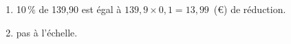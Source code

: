 
\medskip


\medskip

\begin{enumerate}
\item %
10\,\% de 139,90 est égal à $139,9 \times 0,1 = 13,99$~(\euro) de réduction.
\item %
pas à l'échelle.




\end{enumerate}
